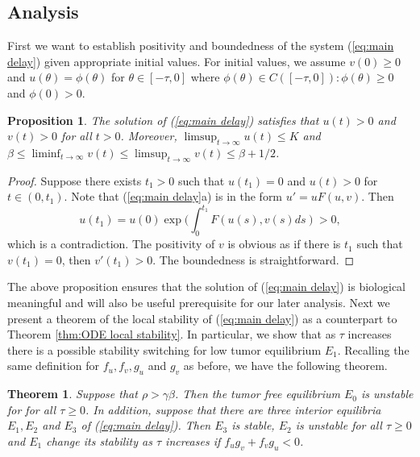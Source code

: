 \documentclass{aims}
\newtheorem{theorem}{Theorem}[section]
\newtheorem{proposition}{Proposition}
\theoremstyle{definition}
\begin{document}
\subsection{Analysis}
First we want to establish positivity and boundedness of the system (\ref{eq:main delay}) given appropriate initial values. For initial values, we assume $v(0) \ge 0$ and $u(\theta) = \phi(\theta)$ for $\theta \in [-\tau,0]$ where $\phi(\theta) \in C([-\tau,0]): \phi(\theta) \ge 0$ and $\phi(0)>0$.

\begin{proposition} \label{prop:bdd}
The solution of (\ref{eq:main delay}) satisfies that $u(t) > 0$ and $v(t) > 0$ for all $t>0$. Moreover, $\limsup_{t\to\infty}u(t) \le K$ and $\beta \le \liminf_{t\to\infty} v(t) \le \limsup_{t\to\infty} v(t) \le \beta+1/2$. 
\end{proposition}
\begin{proof}
Suppose there exists $t_1>0$ such that $u(t_1)=0$ and $u(t)>0$ for $t \in (0,t_1)$. Note that (\ref{eq:main delay}a) is in the form $u'=u F(u,v)$. Then $$u(t_1)=u(0) \exp (\int_0^{t_1} F(u(s),v(s)ds)>0,$$ which is a contradiction. The positivity of $v$ is obvious as if there is $t_1$ such that $v(t_1)=0$, then $v'(t_1)>0$. The boundedness is straightforward.
\end{proof}

The above proposition ensures that the solution of (\ref{eq:main delay}) is biological meaningful and will also be useful prerequisite for our later analysis. Next we present a theorem of the local stability of (\ref{eq:main delay}) as a counterpart to Theorem \ref{thm:ODE local stability}. In particular, we show that as $\tau$ increases there is a possible stability switching for low tumor equilibrium $E_1$. Recalling the same definition for $f_{u},f_{v},g_{u}$ and $g_{v}$ as before, we have the following theorem. 

\begin{theorem}
Suppose that $\rho>\gamma\beta$. Then the tumor free equilibrium $E_0$ is unstable for for all $\tau \ge 0$. In addition, suppose that there are three interior equilibria $E_1,E_2$ and $E_3$ of (\ref{eq:main delay}). Then $E_3$ is stable, $E_2$ is unstable for all $\tau \ge 0$ and $E_1$ change its stability as $\tau$ increases if $f_{u}g_{v}+f_{v}g_{u}<0$.
\end{theorem}
\end{document}
